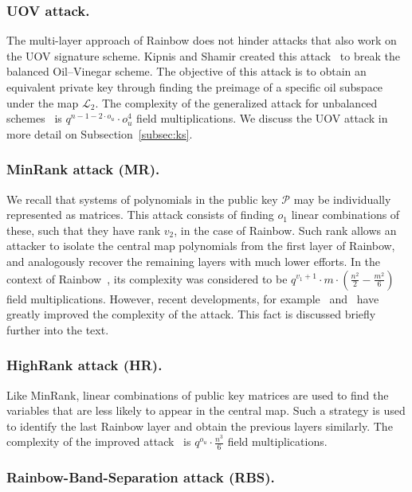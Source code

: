 \documentclass[english]{ufsc-thesis-rn46-2019/ufsc-thesis-rn46-2019}
\theoremstyle{definition}
\begin{document}
\subsubsection{UOV attack.}

The multi-layer approach of Rainbow does not hinder attacks that also work on
the UOV signature scheme. Kipnis and Shamir created this
attack~\cite{Kipnis:199808} to break the balanced Oil--Vinegar scheme. The
objective of this attack is to obtain an equivalent private key through finding
the preimage of a specific oil subspace under the map $\mathcal{L}_{2}$. The
complexity of the generalized attack for unbalanced
schemes~\cite{Kipnis:199904} is $q^{n - 1 - 2 \cdot o_{u}} \cdot o_{u}^{4}$
field multiplications. We discuss the UOV attack in more detail on
Subsection~\ref{subsec:ks}.

\subsubsection{MinRank attack (MR).}

We recall that systems of polynomials in the public key $\mathcal{P}$ may be
individually represented as matrices. This attack consists of finding $o_{1}$
linear combinations of these, such that they have rank $v_{2}$, in the case of
Rainbow. Such rank allows an attacker to isolate the central map polynomials
from the first layer of Rainbow, and analogously recover the remaining layers
with much lower efforts. In the context of
Rainbow~\cite{Billet:200609,Faugere:200808}, its complexity was considered to
be $q^{v_{1} + 1} \cdot m \cdot (\frac{n^{2}}{2} - \frac{m^{2}}{6})$ field
multiplications. However, recent developments, for
example~\cite[Tab.~3]{Bardet:202006} and~\cite{Nakamura:202007} have greatly
improved the complexity of the attack. This fact is discussed briefly further
into the text.

\subsubsection{HighRank attack (HR).}

Like MinRank, linear combinations of public key matrices are used to find the
variables that are less likely to appear in the central map. Such a strategy is
used to identify the last Rainbow layer and obtain the previous layers
similarly. The complexity of the improved attack~\cite{Ding:200806} is
$q^{o_{u}} \cdot \frac{n^{3}}{6}$ field multiplications.

\subsubsection{Rainbow-Band-Separation attack (RBS).}
\end{document}
